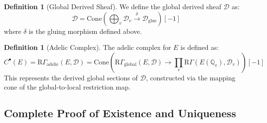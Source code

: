 \documentclass{article}
\theoremstyle{plain}
\theoremstyle{definition}
\newtheorem{definition}[theorem]{Definition}
\theoremstyle{remark}
\begin{document}
\begin{definition}[Global Derived Sheaf]
We define the global derived sheaf $\mathcal{D}$ as:
\[
\mathcal{D} = \text{Cone}\left(\bigoplus_v \mathcal{D}_v \xrightarrow{\delta} \mathcal{D}_{\text{glue}}\right) [-1]
\]
where $\delta$ is the gluing morphism defined above.
\end{definition}

\begin{definition}[Adelic Complex]
The adelic complex for $E$ is defined as:
\[
C^\bullet(E) = \text{R}\Gamma_{\text{adelic}}(E, \mathcal{D}) = \text{Cone}\left(\text{R}\Gamma_{\text{global}}(E, \mathcal{D}) \to \prod_v \text{R}\Gamma(E(\mathbb{Q}_v), \mathcal{D}_v)\right)[-1]
\]
This represents the derived global sections of $\mathcal{D}$, constructed via the mapping cone of the global-to-local restriction map.
\end{definition}

\subsection{Complete Proof of Existence and Uniqueness}
\end{document}
